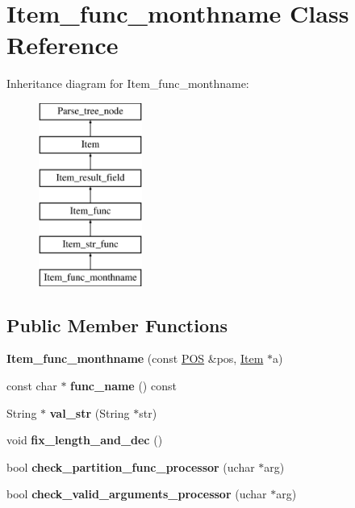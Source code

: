 \hypertarget{classItem__func__monthname}{}\section{Item\+\_\+func\+\_\+monthname Class Reference}
\label{classItem__func__monthname}
Inheritance diagram for Item\+\_\+func\+\_\+monthname\+:\begin{figure}[H]
\begin{center}
\leavevmode
\includegraphics[height=6.000000cm]{classItem__func__monthname}
\end{center}
\end{figure}
\subsection*{Public Member Functions}
\begin{DoxyCompactItemize}
\item 
\mbox{\label{classItem__func__monthname_a1a0c10c4f0ce699b01f569db5d433c31}} 
{\bfseries Item\+\_\+func\+\_\+monthname} (const \mbox{\hyperlink{structYYLTYPE}{P\+OS}} \&pos, \mbox{\hyperlink{classItem}{Item}} $\ast$a)
\item 
\mbox{\label{classItem__func__monthname_aba7d4ad765211de1e9e3a998897b0f58}} 
const char $\ast$ {\bfseries func\+\_\+name} () const
\item 
\mbox{\label{classItem__func__monthname_ac839d4d7e2ce1fc683be7006f89e7ee9}} 
String $\ast$ {\bfseries val\+\_\+str} (String $\ast$str)
\item 
\mbox{\label{classItem__func__monthname_af333d0cc381e8a32575a1c6e99ca9004}} 
void {\bfseries fix\+\_\+length\+\_\+and\+\_\+dec} ()
\item 
\mbox{\label{classItem__func__monthname_ab1dd1922f7886316e6e859859ada7b63}} 
bool {\bfseries check\+\_\+partition\+\_\+func\+\_\+processor} (uchar $\ast$arg)
\item 
\mbox{\label{classItem__func__monthname_ab634a903096386bde7f29889d525c0e3}} 
bool {\bfseries check\+\_\+valid\+\_\+arguments\+\_\+processor} (uchar $\ast$arg)
\end{DoxyCompactItemize}

